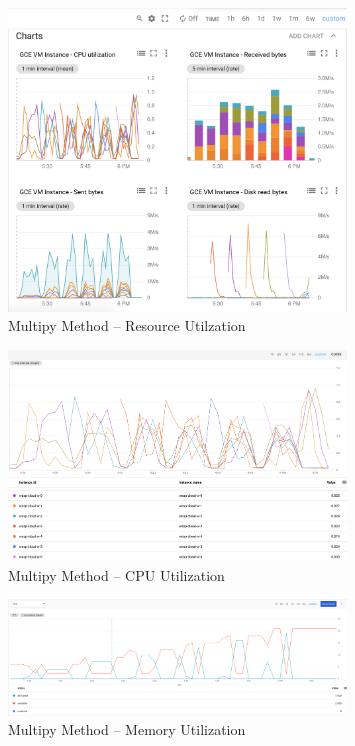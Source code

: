 \documentclass{prog_report}
\begin{document}
\begin{figure}[h!]
    \centering
    \includegraphics[width=0.8\textwidth]{img/multiply-resources}
    \caption{Multipy Method – Resource Utilzation}
    \label{fig:multiply-resources}
\end{figure}

\begin{figure}[h!]
    \centering
    \includegraphics[width=0.8\textwidth]{img/multiply-cpu}
    \caption{Multipy Method – CPU Utilization}
    \label{fig:multiply-cpu}
\end{figure}

\begin{figure}[h!]
    \centering
    \includegraphics[width=0.8\textwidth]{img/multiply-memory}
    \caption{Multipy Method – Memory Utilization}
    \label{fig:multiply-mem}
\end{figure}
\end{document}

